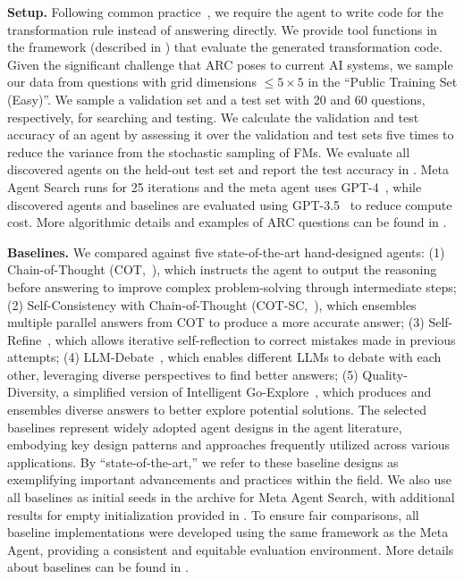 \documentclass{article} %
\newcommand{\ouralgo}{Meta Agent Search\xspace}
\begin{document}
\noindent\textbf{Setup.}\hspace{0.5em} Following common practice~\citep{Greenblatt2024arcSOTA}, we require the agent to write code for the transformation rule instead of answering directly. We provide tool functions in the framework (described in ) that evaluate the generated transformation code.
Given the significant challenge that ARC poses to current AI systems, we sample our data from questions with grid dimensions $\leq 5\times 5$ in the ``Public Training Set (Easy)''.
We sample a validation set and a test set with 20 and 60 questions, respectively, for searching and testing.
We calculate the validation and test accuracy of an agent by assessing it over the validation and test sets five times to reduce the variance from the stochastic sampling of FMs.
We evaluate all discovered agents on the held-out test set and report the test accuracy in .
\ouralgo runs for 25 iterations and the meta agent uses GPT-4~\citep{openai2024gpt4}, while discovered agents and baselines are evaluated using GPT-3.5~\citep{openai_gpt3.5} to reduce compute cost.
More algorithmic details and examples of ARC questions can be found in .


\noindent\textbf{Baselines.}\hspace{0.5em} We compared against five state-of-the-art hand-designed agents: (1) Chain-of-Thought (COT,~\citet{wei2022chain}), which instructs the agent to output the reasoning before answering to improve complex problem-solving through intermediate steps; (2) Self-Consistency with Chain-of-Thought (COT-SC,~\citet{wang2023selfconsistency}), which ensembles multiple parallel answers from COT to produce a more accurate answer; (3) Self-Refine~\citep{madaan2024self,shinn2024reflexion}, which allows iterative self-reflection to correct mistakes made in previous attempts; (4) LLM-Debate~\citep{du2023improving}, which enables different LLMs to debate with each other, leveraging diverse perspectives to find better answers; (5) Quality-Diversity, a simplified version of Intelligent Go-Explore~\citep{lu2024intelligent}, which produces and ensembles diverse answers to better explore potential solutions. The selected baselines represent widely adopted agent designs in the agent literature, embodying key design patterns and approaches frequently utilized across various applications. By “state-of-the-art,” we refer to these baseline designs as exemplifying important advancements and practices within the field.
We also use all baselines as initial seeds in the archive for \ouralgo, with additional results for empty initialization provided in .
To ensure fair comparisons, all baseline implementations were developed using the same framework as the Meta Agent, providing a consistent and equitable evaluation environment.
More details about baselines can be found in . 
\end{document}
